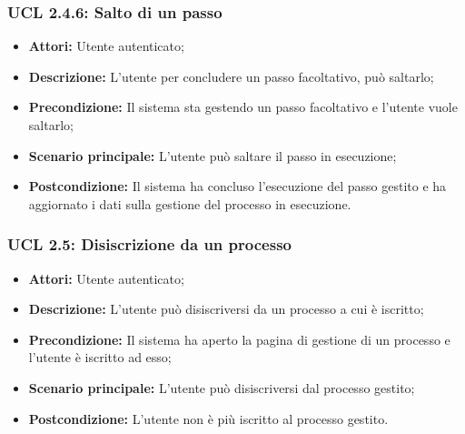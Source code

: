 \hypertarget{L2.4.6}{}
\subsubsection{UCL 2.4.6: Salto di un passo}
\begin{itemize}
\item \textbf{Attori:} Utente autenticato;
\item \textbf{Descrizione:} L'utente per concludere un passo facoltativo, può saltarlo;
\item \textbf{Precondizione:} Il sistema sta gestendo un passo facoltativo e l'utente vuole saltarlo;
\item \textbf{Scenario principale:} L'utente può saltare il passo in esecuzione;
\item \textbf{Postcondizione:} Il sistema ha concluso l'esecuzione del passo gestito e ha aggiornato i dati sulla gestione del processo in esecuzione.
\end{itemize}
\hypertarget{L2.5}{}
\subsubsection{UCL 2.5: Disiscrizione da un processo}
\begin{itemize}
\item \textbf{Attori:} Utente autenticato;
\item \textbf{Descrizione:} L'utente può disiscriversi da un processo a cui è iscritto;
\item \textbf{Precondizione:} Il sistema ha aperto la pagina di gestione di un processo e l'utente è iscritto ad esso;
\item \textbf{Scenario principale:} L'utente può disiscriversi dal processo gestito;
\item \textbf{Postcondizione:} L'utente non è più iscritto al processo gestito.
\end{itemize}

\hypertarget{L3}{}
